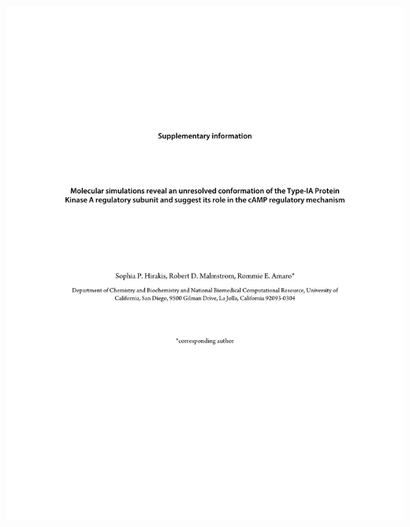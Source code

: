 \documentclass[12pt]{ucsddissertation}
\begin{document}
\includegraphics[height=0.8\textheight]{Flipback_Supplemental_Chapter3.pdf}

\end{document}
